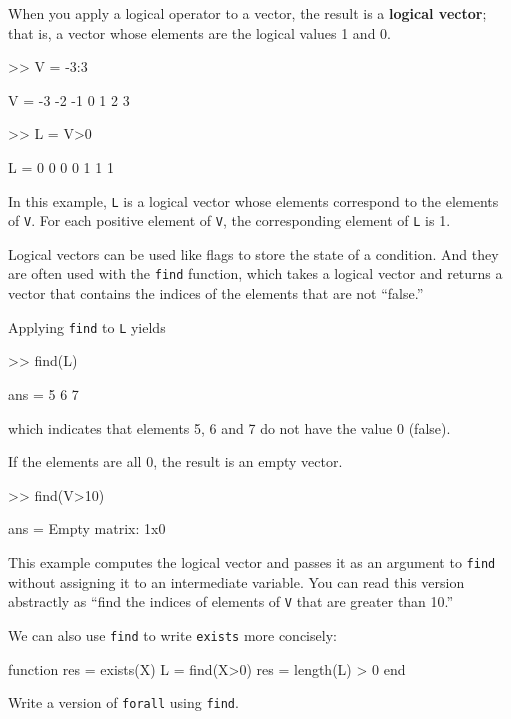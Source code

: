 \documentclass[
]{book}
\numberwithin{Answer}{chapter}
\numberwithin{Exercise}{chapter}
\begin{document}
When you apply a logical operator to a vector, the result is a 
{\bf logical vector}; that is, a vector whose elements are the logical
values 1 and 0.

\begin{code}
>> V = -3:3

V = -3    -2    -1     0     1     2     3

>> L = V>0

L =  0     0     0     0     1     1     1
\end{code}

In this example, {\tt L} is a logical vector whose elements
correspond to the elements of {\tt V}.  For each positive element of
{\tt V}, the corresponding element of {\tt L} is 1.

Logical vectors can be used like flags to store the state of
a condition.  And they are often used with the {\tt find} function,
which takes a logical vector and returns a vector that contains
the indices of the elements that are not ``false.''

Applying {\tt find} to {\tt L} yields

\begin{code}
>> find(L)

ans = 5     6     7
\end{code}

which indicates that elements 5, 6 and 7 do not have the value 0 (false).

If the elements are all 0, the result is an empty vector.

\begin{code}
>> find(V>10)

ans = Empty matrix: 1x0
\end{code}

This example computes the logical vector and passes it as an
argument to {\tt find} without assigning it to an intermediate
variable.  You can read this version abstractly as ``find
the indices of elements of {\tt V} that are greater than 10.''

We can also use {\tt find} to write {\tt exists} more concisely:

\begin{code}
function res = exists(X)
    L = find(X>0)
    res = length(L) > 0
end
\end{code}

\begin{ex}
Write a version of {\tt forall} using {\tt find}.
\end{ex}
\end{document}
